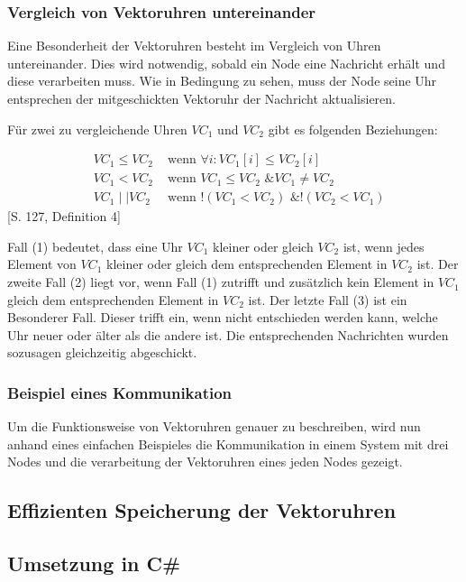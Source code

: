 \subsubsection{Vergleich von Vektoruhren untereinander}
Eine Besonderheit der Vektoruhren besteht im Vergleich von Uhren untereinander. Dies wird notwendig, sobald ein Node eine Nachricht erhält und diese verarbeiten muss. Wie in Bedingung  zu sehen, muss der Node seine Uhr entsprechen der mitgeschickten Vektoruhr der Nachricht aktualisieren. 

Für zwei zu vergleichende Uhren $VC_1$ und $VC_2$ gibt es folgenden Beziehungen:

\begin{eqnarray}
&VC_1 \leq VC_2& \text{ wenn } \forall i : VC_1[i] \leq VC_2[i] \\
	&VC_1 < VC_2& \text{ wenn } VC_1 \leq VC_2 \text{ \& } VC_1 \neq VC_2 \\
	&VC_1 \mid \mid VC_2& \text{ wenn } !(VC_1 < VC_2) \text{ \& } !(VC_2 < VC_1)
\end{eqnarray}
\cite{Mattern88virtualtime}[S. 127, Definition 4]

Fall (1) bedeutet, dass eine Uhr $VC_1$ kleiner oder gleich $VC_2$ ist, wenn jedes Element von $VC_1$ kleiner oder gleich dem entsprechenden Element in $VC_2$ ist. Der zweite Fall (2) liegt vor, wenn Fall (1) zutrifft und zusätzlich kein Element in $VC_1$ gleich dem entsprechenden Element in $VC_2$ ist. 
Der letzte Fall (3) ist ein Besonderer Fall. Dieser trifft ein, wenn nicht entschieden werden kann, welche Uhr neuer oder älter als die andere ist. Die entsprechenden Nachrichten wurden sozusagen gleichzeitig abgeschickt.
\subsubsection{Beispiel eines Kommunikation}
Um die Funktionsweise von Vektoruhren genauer zu beschreiben, wird nun anhand eines einfachen Beispieles die Kommunikation in einem System mit drei Nodes und die verarbeitung der Vektoruhren eines jeden Nodes gezeigt.

\subsection{Effizienten Speicherung der Vektoruhren}
\subsection{Umsetzung in C\#}

